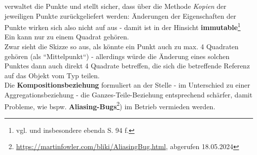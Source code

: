 \noindent
{} verwaltet die Punkte und stellt sicher, dass über die Methode  \textit{Kopien} der jeweiligen Punkte zurückgeliefert werden: Änderungen der Eigenschaften der Punkte wirken sich also nicht auf  aus - damit ist  in der Hinsicht \textbf{immutable}\footnote{
vgl. \cite[21]{LG00} und insbesondere ebenda S. 94 f.
}\\

\noindent
Ein  kann nur zu einem Quadrat gehören.\\
Zwar sieht die Skizze so aus, als könnte ein Punkt auch zu max. 4 Quadraten gehören (als ``Mittelpunkt``) - allerdings würde die Änderung eines solchen Punktes dann auch direkt 4 Quadrate betreffen, die sich die betreffende Referenz auf das Objekt vom Typ  teilen.\\
Die \textbf{Kompositionsbeziehung} formuliert an der Stelle - im Unterschied zu einer Aggregationsbeziehung - die Ganzes-Teile-Beziehung entsprechend schärfer, damit Probleme, wie bspw. \textbf{Aliasing-Bugs}\footnote{
\url{https://martinfowler.com/bliki/AliasingBug.html}, abgerufen 18.05.2024
}) im Betrieb vermieden werden.\\

